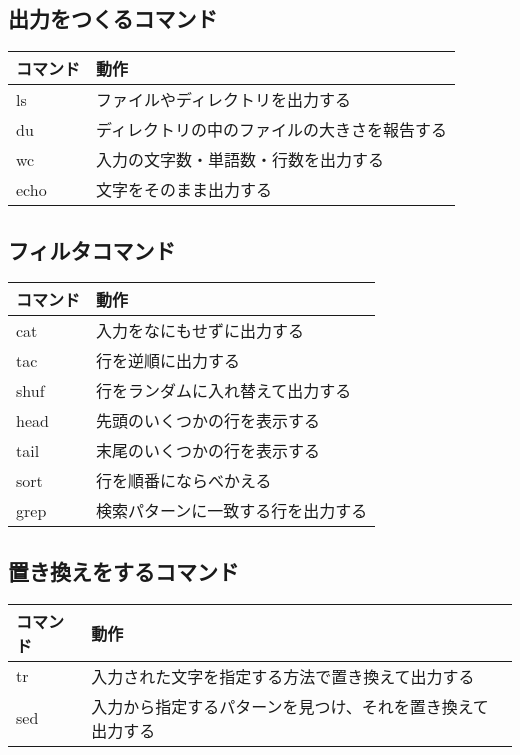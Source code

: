 \subsection{出力をつくるコマンド}
\begin{tabular}{ll}
    コマンド & 動作                                         \\ \hline
    ls       & ファイルやディレクトリを出力する             \\
    du       & ディレクトリの中のファイルの大きさを報告する \\
    wc       & 入力の文字数・単語数・行数を出力する         \\
    echo     & 文字をそのまま出力する                       \\ \hline
\end{tabular}

\subsection{フィルタコマンド}
\begin{tabular}{ll}
    コマンド & 動作                               \\ \hline
    cat      & 入力をなにもせずに出力する         \\
    tac      & 行を逆順に出力する                 \\
    shuf     & 行をランダムに入れ替えて出力する   \\
    head     & 先頭のいくつかの行を表示する       \\
    tail     & 末尾のいくつかの行を表示する       \\
    sort     & 行を順番にならべかえる             \\
    grep     & 検索パターンに一致する行を出力する \\ \hline
\end{tabular}

\subsection{置き換えをするコマンド}
\begin{tabular}{ll}
    コマンド & 動作                                                       \\ \hline
    tr       & 入力された文字を指定する方法で置き換えて出力する           \\
    sed      & 入力から指定するパターンを見つけ、それを置き換えて出力する \\ \hline
\end{tabular}

